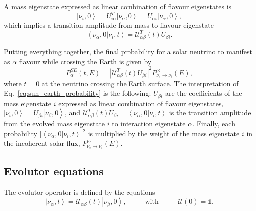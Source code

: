 \documentclass[11pt,a4paper]{article}
\newcommand{\ket}[1]{\left| #1 \right>}
\newcommand{\bra}[1]{\left< #1 \right|}
\newcommand{\braket}[2]{\left< #1 | #2 \right>}
\begin{document}
A mass eigenstate expressed as linear combination of flavour eigenstates is
\begin{equation}
	\ket{\nu_i, 0} = U_{i \alpha}^T \ket{\nu_\alpha, 0} = U_{\alpha i} \ket{\nu_\alpha,0},
\end{equation}
which implies a transition amplitude from mass to flavour eigenstate
\begin{equation}
	\braket{\nu_\alpha, 0}{\nu_i, t} = \mathcal{U}_{\alpha \beta}^T (t) U_{\beta i}.
\end{equation}

Putting everything together, the final probability for a solar neutrino to manifest as $\alpha$ flavour while crossing the Earth is given by
\begin{equation}\label{eq:sun_earth_probability}
	P_\alpha^{SE}(t, E) = \left| \mathcal{U}_{\alpha \beta}^T(t) U_{\beta i} \right|^2  P_{\nu_e \rightarrow \nu_i}^\odot(E),
\end{equation}
where $t=0$ at the neutrino crossing the Earth surface.
The interpretation of Eq.~\ref{eq:sun_earth_probability} is the following: $U_{\beta i}$ are the coefficients of the mass eigenstate $i$ expressed as linear combination of flavour eigenstates, $\ket{\nu_i, 0} = U_{\beta i} \ket{\nu_\beta, 0}$, and $\mathcal{U}^T_{\alpha \beta}(t) U_{\beta i} = \braket{\nu_\alpha, 0}{\nu_i, t}$ is the transition amplitude from the evolved mass eigenstate $i$ to interaction eigenstate $\alpha$. Finally, each probability $|\braket{\nu_\alpha, 0}{\nu_i, t}|^2$ is multiplied by the weight of the mass eigenstate $i$ in the incoherent solar flux, $P_{\nu_e \rightarrow \nu_i}^\odot(E)$.


\subsection{Evolutor equations}

The evolutor operator is defined by the equations
\begin{equation}
	\ket{\nu_\alpha, t} = \mathcal{U}_{\alpha \beta}(t) \ket{\nu_\beta, 0}, \hspace{1cm} \text{ with } \hspace{1cm} \mathcal{U}(0) = \mathbb{1}.
\end{equation}
\end{document}
